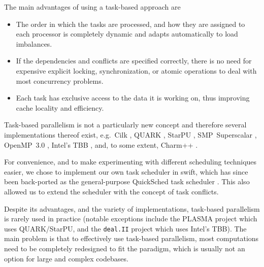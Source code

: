 \documentclass{sig-alternate-05-2015}
\newcommand{\swift}{{\sc swift}\xspace}
\newcommand{\qs}{{\sc QuickSched}\xspace}
\begin{document}
The main advantages of using a task-based approach are
%
\begin{itemize}
    \item The order in which the tasks are processed, and how they
        are assigned to each processor is completely
        dynamic and adapts automatically to load imbalances.
    \item If the dependencies and conflicts are specified correctly,
        there is no need for expensive explicit locking, synchronization,
        or atomic operations to deal with most concurrency problems.
    \item Each task has exclusive access to the data it is working on,
        thus improving cache locality and efficiency.
\end{itemize}
%
Task-based parallelism is not a particularly new concept and therefore
several implementations thereof exist, e.g.~Cilk \cite{ref:Blumofe1995},
QUARK \cite{ref:QUARK}, StarPU \cite{ref:Augonnet2011},
SMP~Superscalar \cite{ref:SMPSuperscalar}, OpenMP~3.0 \cite{ref:Duran2009},
Intel's TBB \cite{ref:Reinders2007}, and, to some extent,
Charm++ \cite{ref:Kale1993}.

For convenience, and to make experimenting with different scheduling
techniques easier, we chose to implement our own task scheduler
in \swift, which has since been back-ported as the general-purpose
\qs task scheduler \cite{gonnet2013quicksched}.
This also allowed us to extend the scheduler with the concept of
task conflicts.

Despite its advantages, and the variety of implementations,
task-based parallelism is rarely used in
practice (notable exceptions include the PLASMA project
\cite{ref:Agullo2009} which uses QUARK/StarPU, and the {\tt deal.II} project
\cite{ref:Bangerth2007} which uses Intel's TBB).
The main problem is that to effectively use task-based parallelism,
most computations need to be completely redesigned to fit the paradigm,
which is usually not an option for large and complex codebases.
\end{document}
